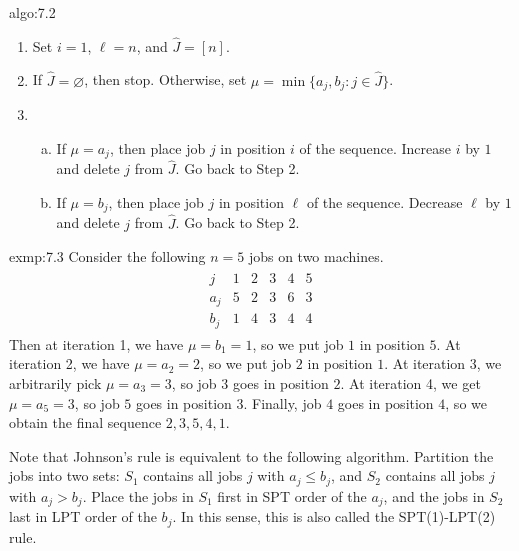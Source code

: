 \begin{algo}{algo:7.2}
    \begin{enumerate}[(1)]
        \item Set $i = 1$, $\ell = n$, and $\hat J = [n]$. 
        \item If $\hat J = \varnothing$, then stop. Otherwise, set 
        $\mu = \min\{a_j, b_j : j \in \hat J\}$. 
        \item \begin{enumerate}[(a)]
            \item If $\mu = a_j$, then place job $j$ in position $i$
            of the sequence. Increase $i$ by $1$ and delete $j$ from 
            $\hat J$. Go back to Step 2. 
            \item If $\mu = b_j$, then place job $j$ in position $\ell$
            of the sequence. Decrease $\ell$ by $1$ and delete $j$ from 
            $\hat J$. Go back to Step 2. 
        \end{enumerate} 
    \end{enumerate}
\end{algo}

\begin{exmp}{exmp:7.3}
    Consider the following $n = 5$ jobs on two machines. 
    \begin{align*}
        \begin{array}{c|ccccc}
            j & 1 & 2 & 3 & 4 & 5 \\ \hline 
            a_j & 5 & 2 & 3 & 6 & 3 \\ 
            b_j & 1 & 4 & 3 & 4 & 4
        \end{array}
    \end{align*}
    Then at iteration 1, we have $\mu = b_1 = 1$, so we put job $1$ 
    in position $5$. At iteration 2, we have $\mu = a_2 = 2$, so we put 
    job $2$ in position $1$. At iteration 3, we arbitrarily pick 
    $\mu = a_3 = 3$, so job $3$ goes in position $2$. At iteration 4, 
    we get $\mu = a_5 = 3$, so job $5$ goes in position $3$. Finally, job 
    $4$ goes in position $4$, so we obtain the final sequence 
    $2, 3, 5, 4, 1$. 
\end{exmp}

Note that Johnson's rule is equivalent to the following algorithm. 
Partition the jobs into two sets: $S_1$ contains all jobs $j$ with 
$a_j \leq b_j$, and $S_2$ contains all jobs $j$ with $a_j > b_j$. 
Place the jobs in $S_1$ first in SPT order of the $a_j$, and the jobs in 
$S_2$ last in LPT order of the $b_j$. In this sense, this is also called 
the SPT(1)-LPT(2) rule. 

